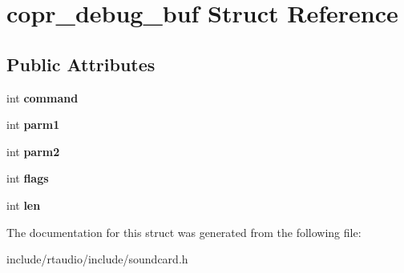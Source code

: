 \hypertarget{structcopr__debug__buf}{}\section{copr\+\_\+debug\+\_\+buf Struct Reference}
\label{structcopr__debug__buf}
\subsection*{Public Attributes}
\begin{DoxyCompactItemize}
\item 
int {\bfseries command}\hypertarget{structcopr__debug__buf_a2e0bd2ab29de937eb1d73419fb99edce}{}\label{structcopr__debug__buf_a2e0bd2ab29de937eb1d73419fb99edce}

\item 
int {\bfseries parm1}\hypertarget{structcopr__debug__buf_aceebc398929e9141351f2e2f7550c3f7}{}\label{structcopr__debug__buf_aceebc398929e9141351f2e2f7550c3f7}

\item 
int {\bfseries parm2}\hypertarget{structcopr__debug__buf_a56c80220a9be01eaabb68b6c5165c67a}{}\label{structcopr__debug__buf_a56c80220a9be01eaabb68b6c5165c67a}

\item 
int {\bfseries flags}\hypertarget{structcopr__debug__buf_ae5c6115dff6fc2fa87da1e3210d52924}{}\label{structcopr__debug__buf_ae5c6115dff6fc2fa87da1e3210d52924}

\item 
int {\bfseries len}\hypertarget{structcopr__debug__buf_a860d698cc7c6148591501eb6c4b7850d}{}\label{structcopr__debug__buf_a860d698cc7c6148591501eb6c4b7850d}

\end{DoxyCompactItemize}


The documentation for this struct was generated from the following file\+:\begin{DoxyCompactItemize}
\item 
include/rtaudio/include/soundcard.\+h\end{DoxyCompactItemize}
